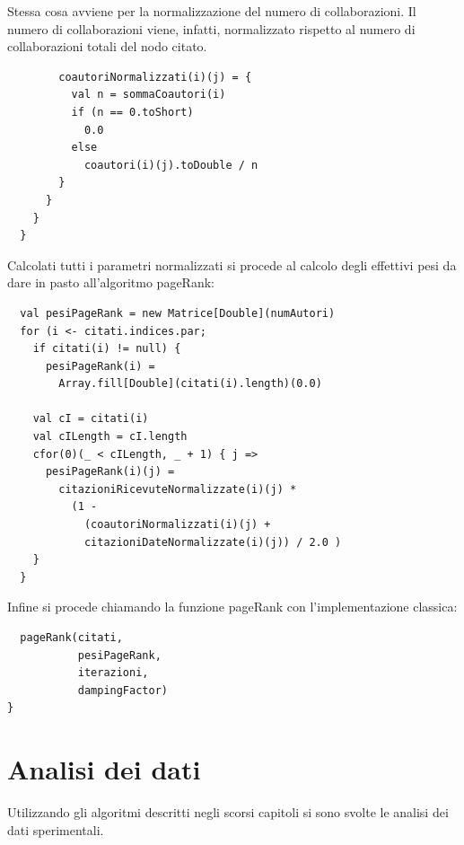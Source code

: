 \documentclass[a4paper, 12pt]{article}
\let\oldsection\section
\renewcommand\section{\clearpage\oldsection}
\begin{document}
Stessa cosa avviene per la normalizzazione del numero di collaborazioni. Il numero di collaborazioni viene, infatti, normalizzato rispetto al numero di collaborazioni totali del nodo citato.
\begin{lstlisting} 
        coautoriNormalizzati(i)(j) = {
          val n = sommaCoautori(i)
          if (n == 0.toShort) 
            0.0 
          else 
            coautori(i)(j).toDouble / n
        }
      }
    }
  }
\end{lstlisting}
Calcolati tutti i parametri normalizzati si procede al calcolo degli effettivi pesi da dare in pasto all'algoritmo pageRank:
\begin{lstlisting}
  val pesiPageRank = new Matrice[Double](numAutori)
  for (i <- citati.indices.par; 
    if citati(i) != null) {
      pesiPageRank(i) = 
        Array.fill[Double](citati(i).length)(0.0)

    val cI = citati(i)
    val cILength = cI.length
    cfor(0)(_ < cILength, _ + 1) { j =>
      pesiPageRank(i)(j) =
        citazioniRicevuteNormalizzate(i)(j) * 
          (1 - 
            (coautoriNormalizzati(i)(j) +
            citazioniDateNormalizzate(i)(j)) / 2.0 )
    }
  }
\end{lstlisting}
Infine si procede chiamando la funzione pageRank con l'implementazione classica:
\begin{lstlisting}
  pageRank(citati,
           pesiPageRank,
           iterazioni,
           dampingFactor)
}
\end{lstlisting}

\section{Analisi dei dati}
Utilizzando gli algoritmi descritti negli scorsi capitoli si sono svolte le analisi dei dati sperimentali.
\end{document}
